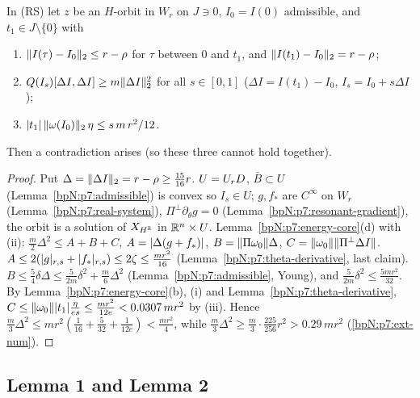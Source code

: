\begin{lemma}\label{bpN:p7:no-exit}
In (RS) let $z$ be an $H$-orbit in $W_r$ on $J\ni0$, $I_0=I(0)$ admissible, and $t_1\in J\setminus\{0\}$ with
\begin{enumerate}[label=(\roman*)]
\item $\lVert I(\tau)-I_0\rVert_2\le r-\rho$ for $\tau$ between $0$ and $t_1$, and $\lVert I(t_1)-I_0\rVert_2=r-\rho$;
\item $Q(I_s)[\Delta I,\Delta I]\ge m\lVert \Delta I\rVert_2^2$ for all $s\in[0,1]$ ($\Delta I=I(t_1)-I_0$, $I_s=I_0+s\Delta I$);
\item $\lvert t_1\rvert\,\lVert \omega(I_0)\rVert_2\,\eta\le s\,m\,r^2/12$.
\end{enumerate}
Then a contradiction arises (so these three cannot hold together).
\end{lemma}
\begin{proof}
Put $\Delta=\lVert \Delta I\rVert_2=r-\rho\ge\frac{15}{16}r$.
\label{stepN:p7:ne-core} $U=U_{r}D$, $\bar B\subset U$ (Lemma~\ref{bpN:p7:admissible}) is convex so $I_s\in U$; $g,f_*$ are $C^\infty$ on $W_r$ (Lemma~\ref{bpN:p7:real-system}), $\Pi^\perp\partial_\theta g=0$ (Lemma~\ref{bpN:p7:resonant-gradient}), the orbit is a solution of $X_{H^{\mathbb{R}}}$ in $\mathbb{R}^n\times U$. Lemma~\ref{bpN:p7:energy-core}(d) with (ii):
$\frac m2\Delta^2\le A+B+C$, $A=\lvert \Delta(g+f_*)\rvert$, $B=\lVert \Pi\omega_0\rVert\Delta$, $C=\lVert \omega_0\rVert\lVert \Pi^\perp\Delta I\rVert$.
\label{stepN:p7:ne-terms} $A\le2(\lvert g\rvert_{r,s}+\lvert f_*\rvert_{r,s})\le2\zeta\le\frac{mr^2}{16}$ (Lemma~\ref{bpN:p7:theta-derivative}, last claim). $B\le\frac54\delta\Delta\le\frac5{2m}\delta^2+\frac m6\Delta^2$ (Lemma~\ref{bpN:p7:admissible}, Young), and $\frac5{2m}\delta^2\le\frac{5mr^2}{32}$. By Lemma~\ref{bpN:p7:energy-core}(b), (i) and Lemma~\ref{bpN:p7:theta-derivative}, $C\le\lVert \omega_0\rVert\lvert t_1\rvert\frac\eta{es}\le\frac{mr^2}{12e}<0.0307\,mr^2$ by (iii).
\label{stepN:p7:ne-contra} Hence $\frac m3\Delta^2\le mr^2(\frac1{16}+\frac5{32}+\frac1{12e})<\frac{mr^2}4$, while $\frac m3\Delta^2\ge\frac m3\cdot\frac{225}{256}r^2>0.29\,mr^2$ (\ref{bpN:p7:ext-num}).
\end{proof}

\subsection{Lemma 1 and Lemma 2}\label{bpN:p7:s-lemmas}

